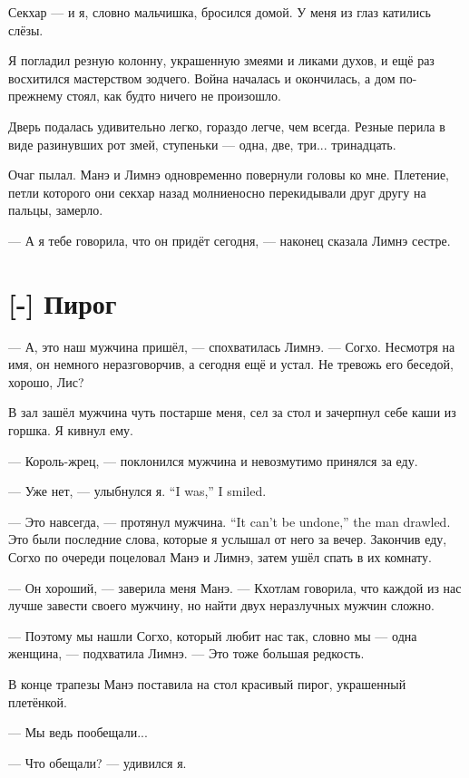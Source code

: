 Секхар --- и я, словно мальчишка, бросился домой.
У меня из глаз катились слёзы.

Я погладил резную колонну, украшенную змеями и ликами духов, и ещё раз восхитился мастерством зодчего.
Война началась и окончилась, а дом по-прежнему стоял, как будто ничего не произошло.

Дверь подалась удивительно легко, гораздо легче, чем всегда.
Резные перила в виде разинувших рот змей, ступеньки --- одна, две, три... тринадцать.

Очаг пылал.
Манэ и Лимнэ одновременно повернули головы ко мне.
Плетение, петли которого они секхар назад молниеносно перекидывали друг другу на пальцы, замерло.

--- А я тебе говорила, что он придёт сегодня, --- наконец сказала Лимнэ сестре.

\section{[-] Пирог}

\textspace

--- А, это наш мужчина пришёл, --- спохватилась Лимнэ.
--- Согхо.
Несмотря на имя, он немного неразговорчив, а сегодня ещё и устал.
Не тревожь его беседой, хорошо, Лис?

В зал зашёл мужчина чуть постарше меня, сел за стол и зачерпнул себе каши из горшка.
Я кивнул ему.

--- Король-жрец, --- поклонился мужчина и невозмутимо принялся за еду.

{--- Уже нет, --- улыбнулся я.}
{``I was,'' I smiled.}

{--- Это навсегда, --- протянул мужчина.}
{``It can't be undone,'' the man drawled.}
Это были последние слова, которые я услышал от него за вечер.
Закончив еду, Согхо по очереди поцеловал Манэ и Лимнэ, затем ушёл спать в их комнату.

--- Он хороший, --- заверила меня Манэ.
--- Кхотлам говорила, что каждой из нас лучше завести своего мужчину, но найти двух неразлучных мужчин сложно.

--- Поэтому мы нашли Согхо, который любит нас так, словно мы --- одна женщина, --- подхватила Лимнэ.
--- Это тоже большая редкость.

В конце трапезы Манэ поставила на стол красивый пирог, украшенный плетёнкой.

--- Мы ведь пообещали...

--- Что обещали? --- удивился я.

